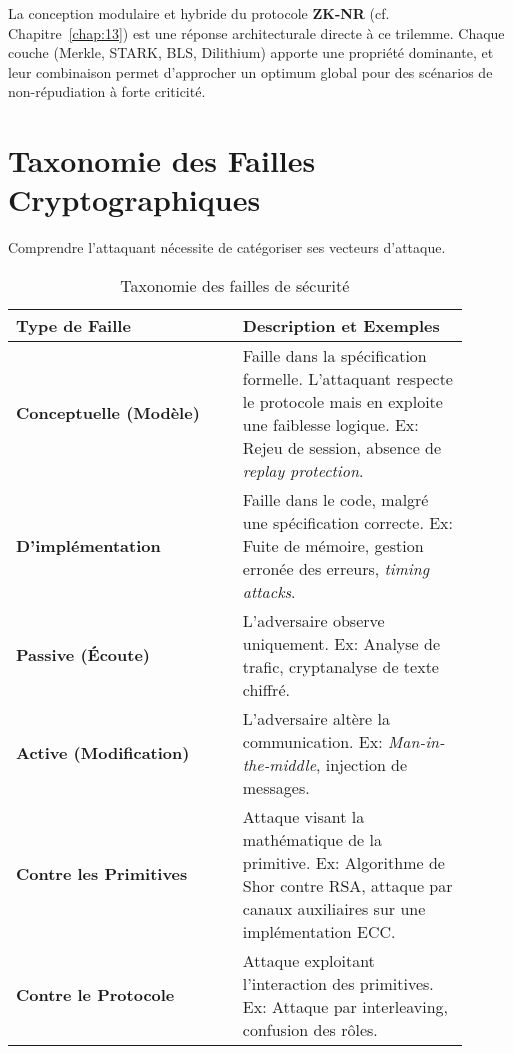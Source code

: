 La conception modulaire et hybride du protocole \textbf{ZK-NR} (cf. Chapitre~\ref{chap:13}) est une réponse architecturale directe à ce trilemme. Chaque couche (Merkle, STARK, BLS, Dilithium) apporte une propriété dominante, et leur combinaison permet d'approcher un optimum global pour des scénarios de non-répudiation à forte criticité.

\section{Taxonomie des Failles Cryptographiques}
\label{sec:17.2}

Comprendre l'attaquant nécessite de catégoriser ses vecteurs d'attaque.

\begin{table}[H]
\centering
\caption{Taxonomie des failles de sécurité}
\label{tab:17.1}
\begin{tabular}{|p{0.45\linewidth}|p{0.45\linewidth}|}
\hline
\textbf{Type de Faille} & \textbf{Description et Exemples} \\
\hline
\hline
\textbf{Conceptuelle (Modèle)} & Faille dans la spécification formelle. L'attaquant respecte le protocole mais en exploite une faiblesse logique. \newline Ex: Rejeu de session, absence de \textit{replay protection}. \\
\hline
\textbf{D'implémentation} & Faille dans le code, malgré une spécification correcte. \newline Ex: Fuite de mémoire, gestion erronée des erreurs, \textit{timing attacks}. \\
\hline
\textbf{Passive (Écoute)} & L'adversaire observe uniquement. \newline Ex: Analyse de trafic, cryptanalyse de texte chiffré. \\
\hline
\textbf{Active (Modification)} & L'adversaire altère la communication. \newline Ex: \textit{Man-in-the-middle}, injection de messages. \\
\hline
\textbf{Contre les Primitives} & Attaque visant la mathématique de la primitive. \newline Ex: Algorithme de Shor contre RSA, attaque par canaux auxiliaires sur une implémentation ECC. \\
\hline
\textbf{Contre le Protocole} & Attaque exploitant l'interaction des primitives. \newline Ex: Attaque par interleaving, confusion des rôles. \\
\hline
\end{tabular}
\end{table}

